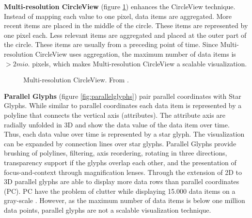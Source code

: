 \par
\textbf{Multi-resolution CircleView} (figure \ref{fig:multiresolutioncircleview}) enhances the CircleView technique. Instead of mapping each value to one pixel, data items are aggregated. More recent items are placed in the middle of the circle. These items are represented by one pixel each. Less relevant items are aggregated and placed at the outer part of the circle. These items are usually from a preceding point of time. Since Multi-resolution CircleView uses aggregation, the maximum number of data items is $> 2mio.$ pixels, which makes Multi-resolution CircleView a scalable visualization.
\begin{figure}[H]
    \centering
    \caption[Multi-Resolution CircleView]{Multi-resolution CircleView. From  \cite{Keim2005}.}
    \label{fig:multiresolutioncircleview}
\end{figure}
\par
\textbf{Parallel Glyphs} (figure \ref{fig:parallelglyphs}) pair parallel coordinates with Star Glyphs. While similar to parallel coordinates each data item is represented by a polyline that connects the vertical axis (attributes). The attribute axis are radially unfolded in 3D and show the data value of the data item over time. Thus, each data value over time is represented by a star glyph. The visualization can be expanded by connection lines over star glyphs. Parallel Glyphs provide brushing of polylines, filtering, axis reordering, rotating in three directions,  transparency support if the glyphs overlap each other, and the presentation of focus-and-context through magnification lenses. Through the extension of 2D to 3D parallel glyphs are able to display more data rows than parallel coordinates (\gls{PC}). \gls{PC} have the problem of clutter while displaying 15.000 data items on a gray-scale  \cite{Keim2000Tut}. However, as the maximum number of data items is below one million data points, parallel glyphs are not a scalable visualization technique. 

